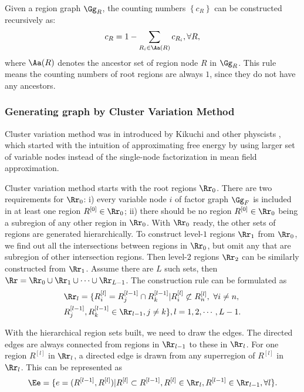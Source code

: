Given a region graph $\Gg_R$, the counting numbers $\left\{ c_R \right\}$ can be constructed recursively as:
\begin{equation}
  c_R = 1 - \sum_{R_i \in \Aa(R)} c_{R_i}, \forall R,
\end{equation}
where $\Aa(R)$ denotes the ancestor set of region node $R$ in $\Gg_R$. This rule means the counting numbers of root regions are always $1$, since they do not have any ancestors.


\subsubsection{Generating graph by Cluster Variation Method}
\label{sec:cluster-variation-method}
Cluster variation method was in introduced by Kikuchi and other physcists \cite{PhysRev.81.988,morita1991cluster}, which started with the intuition of approximating free energy by using larger set of variable nodes instead of the single-node factorization in mean field approximation.

Cluster variation method starts with the root regions $\Rr_0$. There are two requirements for $\Rr_0$: i) every variable node $i$ of factor graph $\Gg_F$ is included in at least one region $R^{[0]}\in\Rr_0$; ii) there should be no region $R^{[0]}\in \Rr_0$ being a subregion of any other region in $\Rr_0$.
With $\Rr_0$ ready, the other sets of regions are generated hierarchically. To construct level-$1$ regions $\Rr_1$ from $\Rr_0$, we find out all the intersections between regions in $\Rr_0$, but omit any that are subregion of other intersection regions. Then level-$2$ regions $\Rr_2$ can be similarly constructed from $\Rr_1$. Assume there are $L$ such sets, then $\Rr = \Rr_0 \cup \Rr_1 \cup \cdots \cup \Rr_{L-1}$. The construction rule can be formulated as
\begin{align}
  &\Rr_l = \{ R^{[l]}_i = R^{[l-1]}_j \cap R^{[l-1]}_k | R^{[l]}_i \not\subset R^{[l]}_n,~ \forall i \neq n, \nonumber \\
  &R^{[l-1]}_j, R^{[l-1]}_k \in \Rr_{l-1} , j\neq k\}, l=1, 2, \cdots, L-1.
\end{align}

With the hierarchical region sets built, we need to draw the edges. The directed edges are always connected from regions in $\Rr_{l-1}$ to these in $\Rr_{l}$. For one region $R^{[l]}$ in $\Rr_l$, a directed edge is drawn from any superregion of $R^{[l]}$ in $\Rr_l$. This can be represented as
\begin{align}
  \Ee = \{ e = (R^{[l-1]}, R^{[l]}) | R^{[l]} \subset R^{[l-1]}, R^{[l]} \in \Rr_l, R^{[l-1]} \in \Rr_{l-1} , \forall l\}.
\end{align}



